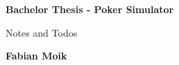 

\begin{titlepage}
       \begin{center}
             \begin{huge}
                   \textbf{Bachelor Thesis - Poker Simulator}
             \end{huge}
       \end{center}
       \begin{center}
             \begin{large}
		Notes and Todos
             \end{large}
       \end{center}
       \begin{center}
             \begin{large}
                 \textbf{Fabian Moik}
             \end{large}
       \end{center}
\end{titlepage}





%    
%    


\tableofcontents


